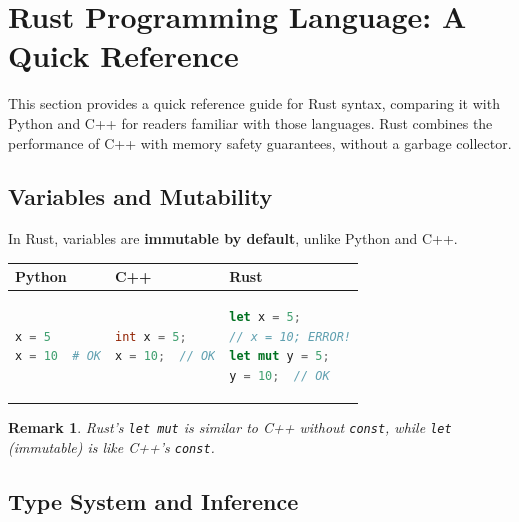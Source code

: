 \documentclass[11pt,a4paper]{article}
\newtheorem{remark}{Remark}
\begin{document}
\section{Rust Programming Language: A Quick Reference}

This section provides a quick reference guide for Rust syntax, comparing it with Python and C++ for readers familiar with those languages. Rust combines the performance of C++ with memory safety guarantees, without a garbage collector.

\subsection{Variables and Mutability}

In Rust, variables are \textbf{immutable by default}, unlike Python and C++.

\begin{center}
\begin{tabular}{p{4cm}p{4cm}p{4cm}}
\toprule
\textbf{Python} & \textbf{C++} & \textbf{Rust} \\
\midrule
\begin{lstlisting}[language=Python,frame=none,numbers=none]
x = 5
x = 10  # OK
\end{lstlisting}
&
\begin{lstlisting}[language=C++,frame=none,numbers=none]
int x = 5;
x = 10;  // OK
\end{lstlisting}
&
\begin{lstlisting}[language=Rust,frame=none,numbers=none]
let x = 5;
// x = 10; ERROR!
let mut y = 5;
y = 10;  // OK
\end{lstlisting}
\\
\bottomrule
\end{tabular}
\end{center}

\begin{remark}
Rust's \texttt{let mut} is similar to C++ without \texttt{const}, while \texttt{let} (immutable) is like C++'s \texttt{const}.
\end{remark}

\subsection{Type System and Inference}
\end{document}
